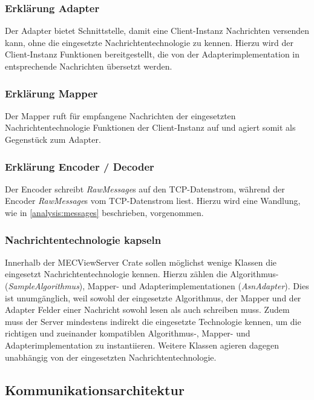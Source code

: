 \subsubsection{Erklärung Adapter}

Der Adapter bietet  Schnittstelle, damit eine Client-Instanz Nachrichten versenden kann, ohne die eingesetzte Nachrichtentechnologie zu kennen.
Hierzu wird der Client-Instanz Funktionen bereitgestellt, die von der Adapterimplementation in entsprechende Nachrichten übersetzt werden.

\subsubsection{Erklärung Mapper}

Der Mapper ruft für empfangene Nachrichten der eingesetzten Nachrichtentechnologie Funktionen der Client-Instanz auf und agiert somit als Gegenstück zum Adapter.

\subsubsection{Erklärung Encoder / Decoder}

Der Encoder schreibt \textit{RawMessage}s auf den TCP-Datenstrom, während der Encoder \textit{RawMessage}s vom TCP-Datenstrom liest.
Hierzu wird eine Wandlung, wie in \autoref{analysis:messages} beschrieben, vorgenommen.

\subsubsection{Nachrichtentechnologie kapseln}

Innerhalb der MECViewServer Crate sollen möglichst wenige Klassen die eingesetzt Nachrichtentechnologie kennen.
Hierzu zählen die Algorithmus- (\textit{SampleAlgorithmus}), Mapper- und Adapterimplementationen (\textit{AsnAdapter}).
Dies ist unumgänglich, weil sowohl der eingesetzte Algorithmus, der Mapper und der Adapter Felder einer Nachricht sowohl lesen als auch schreiben muss.
Zudem muss der Server mindestens indirekt die eingesetzte Technologie kennen, um die richtigen und zueinander kompatiblen Algorithmus-, Mapper- und Adapterimplementation zu instantiieren.
Weitere Klassen agieren dagegen unabhängig von der eingesetzten Nachrichtentechnologie.

\subsection{Kommunikationsarchitektur}
\label{design:communication:architecture}
\label{design:communication:architecture:async}

